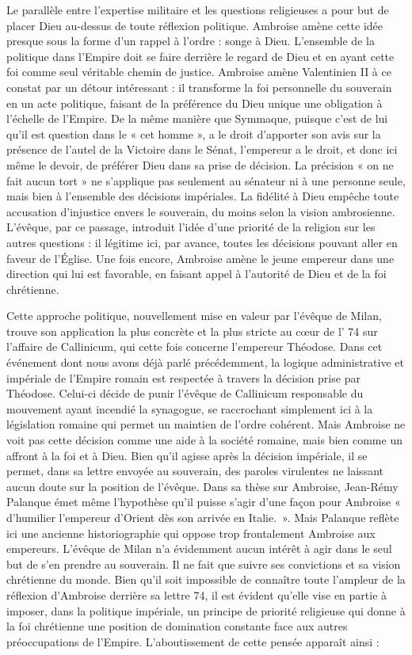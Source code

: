 Le parallèle entre l’expertise militaire et les questions religieuses a pour but de placer Dieu au-dessus de toute réflexion politique. Ambroise amène cette idée presque sous la forme d’un rappel à l’ordre : songe à Dieu. L’ensemble de la politique dans l’Empire doit se faire derrière le regard de Dieu et en ayant cette foi comme seul véritable chemin de justice. Ambroise amène Valentinien II à ce constat par un détour intéressant : il transforme la foi personnelle du souverain en un acte politique, faisant de la préférence du Dieu unique une obligation à l’échelle de l’Empire. De la même manière que Symmaque, puisque c’est de lui qu'il est question dans le « cet homme », a le droit d’apporter son avis sur la présence de l’autel de la Victoire dans le Sénat, l'empereur a le droit, et donc ici même le devoir, de préférer Dieu dans sa prise de décision. La précision « on ne fait aucun tort » ne s’applique pas seulement au sénateur ni à une personne seule, mais bien à l'ensemble des décisions impériales. La fidélité à Dieu empêche toute accusation d’injustice envers le souverain, du moins selon la vision ambrosienne. L’évêque, par ce passage, introduit l’idée d’une priorité de la religion sur les autres questions : il légitime ici, par avance, toutes les décisions pouvant aller en faveur de l’Église. Une fois encore, Ambroise amène le jeune empereur dans une direction qui lui est favorable, en faisant appel à l’autorité de Dieu et de la foi chrétienne.

\bigskip

Cette approche politique, nouvellement mise en valeur par l’évêque de Milan, trouve son application la plus concrète et la plus stricte au cœur de l' 74 sur l’affaire de Callinicum, qui cette fois concerne l’empereur Théodose. Dans cet événement dont nous avons déjà parlé précédemment, la logique administrative et impériale de l’Empire romain est respectée à travers la décision prise par Théodose. Celui-ci décide de punir l’évêque de Callinicum responsable du mouvement ayant incendié la synagogue, se raccrochant simplement ici à la législation romaine qui permet un maintien de l’ordre cohérent. Mais Ambroise ne voit pas cette décision comme une aide à la société romaine, mais bien comme un affront à la foi et à Dieu. Bien qu’il agisse après la décision impériale, il se permet, dans sa lettre envoyée au souverain, des paroles virulentes ne laissant aucun doute sur la position de l’évêque. Dans sa thèse sur Ambroise, Jean-Rémy Palanque émet même l’hypothèse qu’il puisse s’agir d’une façon pour Ambroise « d’humilier l’empereur d’Orient dès son arrivée en Italie\autocite[374]{palanque_ambroise}.~». Mais Palanque reflète ici une ancienne historiographie qui oppose trop frontalement Ambroise aux empereurs. L'évêque de Milan n'a évidemment aucun intérêt à agir dans le seul but de s'en prendre au souverain. Il ne fait que suivre ses convictions et sa vision chrétienne du monde. Bien qu’il soit impossible de connaître toute l’ampleur de la réflexion d’Ambroise derrière sa lettre 74, il est évident qu’elle vise en partie à imposer, dans la politique impériale, un principe de priorité religieuse qui donne à la foi chrétienne une position de domination constante face aux autres préoccupations de l’Empire. L'aboutissement de cette pensée apparaît ainsi :

